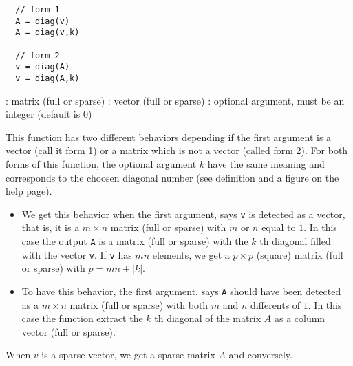 \begin{mandesc}
\end{mandesc}
\begin{calling_sequence}
\begin{verbatim}
  // form 1
  A = diag(v)
  A = diag(v,k)

  // form 2
  v = diag(A)
  v = diag(A,k)
\end{verbatim}
\end{calling_sequence}
\begin{parameters}
  \begin{varlist}
     : matrix (full or sparse)
     : vector (full or sparse)
     : optional argument, must be an integer (default is $0$)
  \end{varlist}
\end{parameters}

\begin{mandescription}

  This function has two different behaviors depending if the first argument is a vector
  (call it form 1) or a matrix which is not a vector (called form 2).
  For both forms of this function, the optional argument $k$ have the same meaning and
 corresponds to the choosen diagonal number (see definition and a figure on the 
  help page).

\begin{itemize}
\item {}
   We get this behavior when the first argument, says \verb+v+ is detected as a vector, that is,
 it is a $m \times n$ matrix (full or sparse) with $m$ or $n$ equal to $1$. In this case the
 output  \verb+A+ is a matrix (full or sparse) with the $k$ th diagonal filled with the vector
 \verb+v+. If  \verb+v+ has $mn$ elements, we get a $p \times p$ (square) matrix (full or sparse)
 with $p=mn + | k |$.
   
\item {}
  To have this behavior, the first argument, says \verb+A+ should have been detected as 
a  $m \times n$ matrix (full or sparse) with both $m$ and $n$ differents of $1$. In this 
case the function extract the $k$ th diagonal of the matrix $A$ as a column vector (full or sparse).
\end{itemize}

 When $v$ is a sparse vector, we get a sparse matrix $A$ and conversely.


\end{mandescription}

